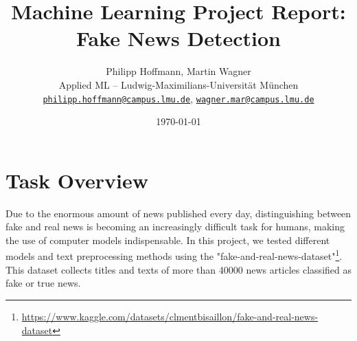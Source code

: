 \documentclass[10pt]{article}
\title{\textbf{Machine Learning Project Report: Fake News Detection}}
\author{Philipp Hoffmann, Martin Wagner \\
	Applied ML – Ludwig-Maximilians-Universität München \\
	\texttt{\href{mailto:philipp.hoffmann@campus.lmu.de}{philipp.hoffmann@campus.lmu.de}},
	\texttt{\href{mailto:wagner.mar@campus.lmu.de}{wagner.mar@campus.lmu.de}}}
\date{\today}
\begin{document}
	
	\maketitle
	\section{Task Overview}
	Due to the enormous amount of news published every day, distinguishing between fake and real news is becoming an increasingly difficult task for humans, making the use of computer models indispensable. In this project, we tested different models and text preprocessing methods using the "fake-and-real-news-dataset"\footnote{\url{https://www.kaggle.com/datasets/clmentbisaillon/fake-and-real-news-dataset}}. This dataset collects titles and texts of more than 40000 news articles classified as fake or true news.
	
\end{document}
